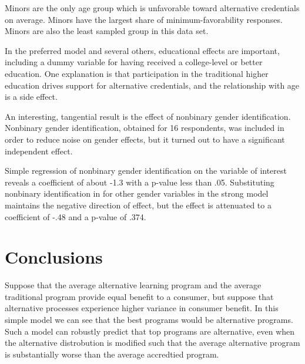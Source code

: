 \documentclass[AER]{./aea-latex-templates/AEA}
\begin{document}
        Minors are the only age group which is unfavorable toward alternative credentials on average.
        Minors have the largest share of minimum-favorability responses.
        Minors are also the least sampled group in this data set.
        
        In the preferred model and several others, educational effects are important, including a
        dummy variable for having received a college-level or better education.
        One explanation is that participation in the traditional higher education
        drives support for alternative credentials, and the relationship with age is a
        side effect.
        
        An interesting, tangential result is the effect of nonbinary gender identification.
        Nonbinary gender identification, obtained for 16 respondents, was included in order to
        reduce noise on gender effects, but it turned out to have a significant independent effect.
        
        Simple regression of nonbinary gender identification on the variable of
        interest reveals a coefficient of about -1.3 with a p-value less than .05.
        Substituting nonbinary identification in for other gender variables in the strong model
        maintains the negative direction of effect, but the effect is
        attenuated to a coefficient of -.48 and a p-value of .374.
        
        \section{Conclusions}
        
        Suppose that the average alternative learning program and the average traditional program
        provide equal benefit to a consumer, but suppose that alternative
        processes experience higher variance in consumer benefit. In this
        simple model we can see that the best programs would be alternative
        programs. Such a model can robustly predict that top programs are
        alternative, even when the alternative distrobution is modified such
        that the average alternative program is substantially worse than the
        average accredtied program.
        
\end{document}
